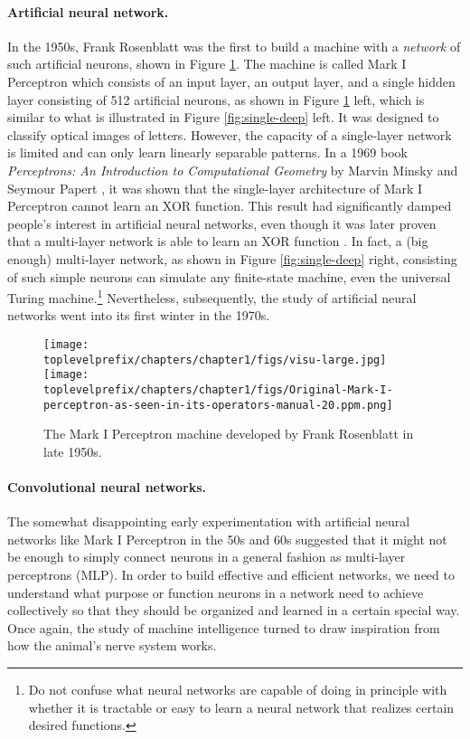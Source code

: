 \documentclass[\toplevelprefix/book-main.tex]{subfiles}
\begin{document}
\paragraph{Artificial neural network.}
In the 1950s, Frank Rosenblatt was the first to build a machine with a {\em network} of such artificial neurons, shown in Figure \ref{fig:perceptron}. The machine is called Mark I Perceptron which consists of an input layer, an output layer, and a single hidden layer consisting of 512 artificial neurons, as shown in Figure \ref{fig:perceptron} left,  which is similar to what is illustrated in Figure \ref{fig:single-deep} left. It was designed to classify optical images of letters. However, the capacity of a single-layer network is limited and can only learn linearly separable patterns. In a 1969 book {\em Perceptrons: An Introduction to Computational Geometry} by Marvin Minsky and Seymour Papert \cite{Minsky-1969}, it was shown that the single-layer architecture of Mark I Perceptron cannot learn an XOR function. This result had significantly damped people's interest in artificial neural networks, even though it was later proven that a multi-layer network is able to learn an XOR function \cite{Rumelhart1986}. In fact, a (big enough) multi-layer network, as shown in Figure \ref{fig:single-deep} right,  consisting of such simple neurons can simulate any finite-state machine, even the universal Turing machine.\footnote{Do not confuse what neural networks are  capable of doing in principle with whether it is tractable or easy to learn a neural network that realizes certain desired functions.}  Nevertheless, subsequently, the study of artificial neural networks went into its first winter in the 1970s.

\begin{figure}
    \centering
    \texttt{[image: \\toplevelprefix/chapters/chapter1/figs/visu-large.jpg]}
    \hspace{2mm} \texttt{[image: \\toplevelprefix/chapters/chapter1/figs/Original-Mark-I-perceptron-as-seen-in-its-operators-manual-20.ppm.png]}
    \caption{The Mark I Perceptron machine developed by Frank Rosenblatt in late 1950s.}
    \label{fig:perceptron}
\end{figure}


\paragraph{Convolutional neural networks.}
The somewhat disappointing early experimentation with artificial neural networks like Mark I Perceptron in the 50s and 60s suggested that it might not be enough to simply connect neurons in a general fashion as multi-layer perceptrons (MLP). In order to build effective and efficient networks, we need to understand what purpose or function neurons in a network need to achieve collectively so that they should be organized and learned in a certain special way. Once again, the study of machine intelligence turned to draw inspiration from how the animal's nerve system works. 
\end{document}
